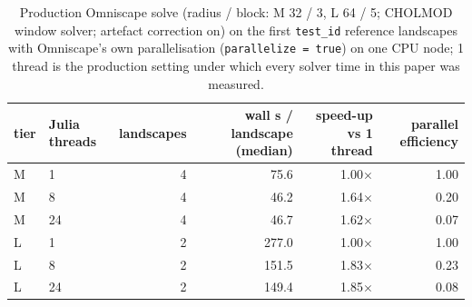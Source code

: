 \begin{table}[tb]
\centering
\footnotesize
\setlength{\tabcolsep}{3.5pt}
\caption{Production Omniscape solve (radius / block: M 32 / 3, L 64 / 5; CHOLMOD window solver; artefact correction on) on the first \texttt{test\_id} reference landscapes with Omniscape's own parallelisation (\texttt{parallelize = true}) on one CPU node; 1 thread is the production setting under which every solver time in this paper was measured.}
\label{tab:threads}
\begin{tabular}{llrrrr}
\toprule
tier & Julia threads & landscapes & wall s / landscape (median) & speed-up vs 1 thread & parallel efficiency \\
\midrule
M & 1 & 4 & 75.6 & 1.00$\times$ & 1.00 \\
M & 8 & 4 & 46.2 & 1.64$\times$ & 0.20 \\
M & 24 & 4 & 46.7 & 1.62$\times$ & 0.07 \\
L & 1 & 2 & 277.0 & 1.00$\times$ & 1.00 \\
L & 8 & 2 & 151.5 & 1.83$\times$ & 0.23 \\
L & 24 & 2 & 149.4 & 1.85$\times$ & 0.08 \\
\bottomrule
\end{tabular}
\end{table}
